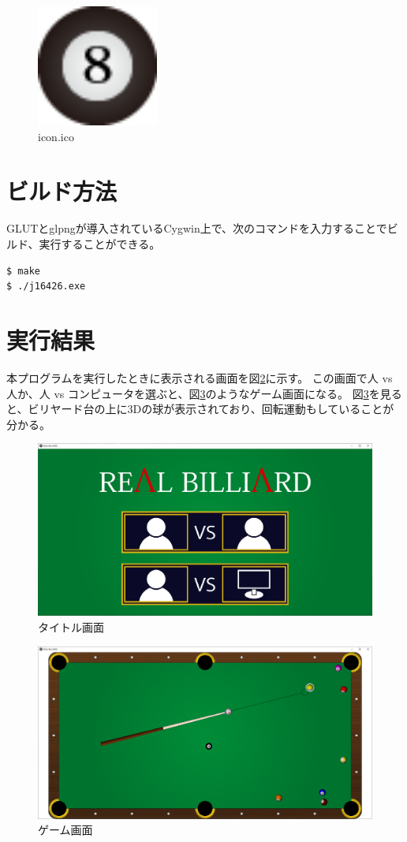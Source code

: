 \documentclass[a4j,titlepage]{jsarticle}
\begin{document}
\begin{figure}[H]
  \centering
  \includegraphics[width=4cm]{../icon/icon-48.png}
  \caption{icon.ico}
  \label{fig:icon}
\end{figure}


\section{ビルド方法}
GLUTとglpngが導入されているCygwin上で、次のコマンドを入力することでビルド、実行することができる。

\begin{lstlisting}[style=text]
$ make
$ ./j16426.exe
\end{lstlisting}


\section{実行結果}
本プログラムを実行したときに表示される画面を図\ref{fig:res1}に示す。
この画面で人 vs 人か、人 vs コンピュータを選ぶと、図\ref{fig:res2}のようなゲーム画面になる。
図\ref{fig:res2}を見ると、ビリヤード台の上に3Dの球が表示されており、回転運動もしていることが分かる。

\begin{figure}[H]
  \centering
  \includegraphics[width=12cm]{result1.png}
  \caption{タイトル画面}
  \label{fig:res1}
\end{figure}

\begin{figure}[H]
  \centering
  \includegraphics[width=12cm]{result2.png}
  \caption{ゲーム画面}
  \label{fig:res2}
\end{figure}
\end{document}
